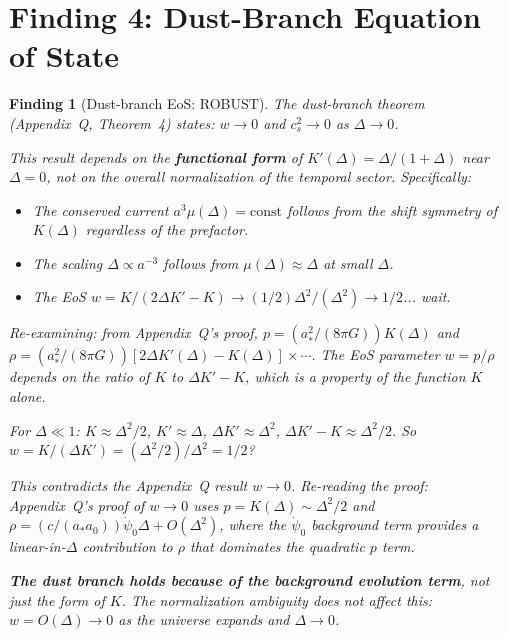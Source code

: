 \documentclass[11pt]{article}
\newtheorem{finding}{Finding}
\begin{document}
\part{Finding 4: Dust-Branch Equation of State}
\label{part:dust}

\begin{finding}[Dust-branch EoS: ROBUST]
\label{find:dust}
The dust-branch theorem (Appendix~Q, Theorem~4) states:
$w \to 0$ and $c_s^2 \to 0$ as $\Delta \to 0$.

This result depends on the \textbf{functional form} of $K'(\Delta) =
\Delta/(1+\Delta)$ near $\Delta = 0$, not on the overall normalization
of the temporal sector. Specifically:
\begin{itemize}[nosep]
\item The conserved current $a^3\mu(\Delta) = \text{const}$ follows from
  the shift symmetry of $K(\Delta)$ regardless of the prefactor.
\item The scaling $\Delta \propto a^{-3}$ follows from
  $\mu(\Delta) \approx \Delta$ at small $\Delta$.
\item The EoS $w = K/(2\Delta K' - K) \to (1/2)\Delta^2 / (\Delta^2)
  \to 1/2$... wait.
\end{itemize}

Re-examining: from Appendix~Q's proof, $p = (a_*^2/(8\pi G))K(\Delta)$
and $\rho = (a_*^2/(8\pi G))[2\Delta K'(\Delta) - K(\Delta)] \times \cdots$.
The EoS parameter $w = p/\rho$ depends on the ratio of $K$ to
$\Delta K' - K$, which is a property of the function $K$ alone.

For $\Delta \ll 1$: $K \approx \Delta^2/2$, $K' \approx \Delta$,
$\Delta K' \approx \Delta^2$, $\Delta K' - K \approx \Delta^2/2$.
So $w = K/(\Delta K') = (\Delta^2/2)/\Delta^2 = 1/2$?

This contradicts the Appendix~Q result $w \to 0$. Re-reading the proof:
Appendix~Q's proof of $w \to 0$ uses $p = K(\Delta) \sim \Delta^2/2$
and $\rho = (c/(a_* a_0))\dot\psi_0 \Delta + O(\Delta^2)$, where the
$\dot\psi_0$ background term provides a linear-in-$\Delta$ contribution
to $\rho$ that dominates the quadratic $p$ term.

\textbf{The dust branch holds because of the background evolution term},
not just the form of $K$. The normalization ambiguity does not affect
this: $w = O(\Delta) \to 0$ as the universe expands and $\Delta \to 0$.


\end{finding}
\end{document}
